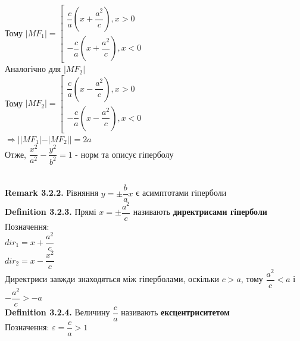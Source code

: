 \documentclass[a4paper, 14pt]{extarticle}
\def\defin#1{\textbf{Definition {#1}}}
\def\rm#1{\textbf{Remark {#1}}}
\def\bigline{\vspace{5mm}\\}
\begin{document}
Тому $|MF_1| = \left[ \begin{gathered} \dfrac{c}{a} \left(x + \dfrac{a^2}{c} \right), x > 0 \\ -\dfrac{c}{a} \left(x + \dfrac{a^2}{c} \right), x < 0 \end{gathered} \right.$\\
Аналогічно для $|MF_2|$\\
Тому $|MF_2| = \left[ \begin{gathered} \dfrac{c}{a} \left(x - \dfrac{a^2}{c} \right), x > 0 \\ -\dfrac{c}{a} \left(x - \dfrac{a^2}{c} \right), x < 0 \end{gathered} \right.$\\
$\Rightarrow ||MF_1| - |MF_2|| = 2a$
\bigline
Отже, $\dfrac{x^2}{a^2} - \dfrac{y^2}{b^2} = 1$ - норм та описує гіперболу\\
\\
\rm{3.2.2.} Рівняння $y = \pm \dfrac{b}{a}x$ є асимптотами гіперболи
\bigline
\defin{3.2.3.} Прямі $x = \pm \dfrac{a^2}{c}$ називають \textbf{директрисами гіперболи}\\
Позначення:\\
$dir_1 = x + \dfrac{a^2}{c}$\\
$dir_2 = x - \dfrac{x^2}{c}$
\bigline
Директриси завжди знаходяться між гіперболами, оскільки $c > a$, тому $\dfrac{a^2}{c} < a$ і $-\dfrac{a^2}{c} > -a$
\bigline
\defin{3.2.4.} Величину $\dfrac{c}{a}$ називають \textbf{ексцентриситетом}\\
Позначення: $\varepsilon = \dfrac{c}{a} > 1$ \bigline
\end{document}
